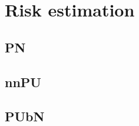 \section{Risk estimation}\label{sec:RiskEstimators}

\subsection{PN}

\subsection{nnPU}

\subsection{PUbN}
